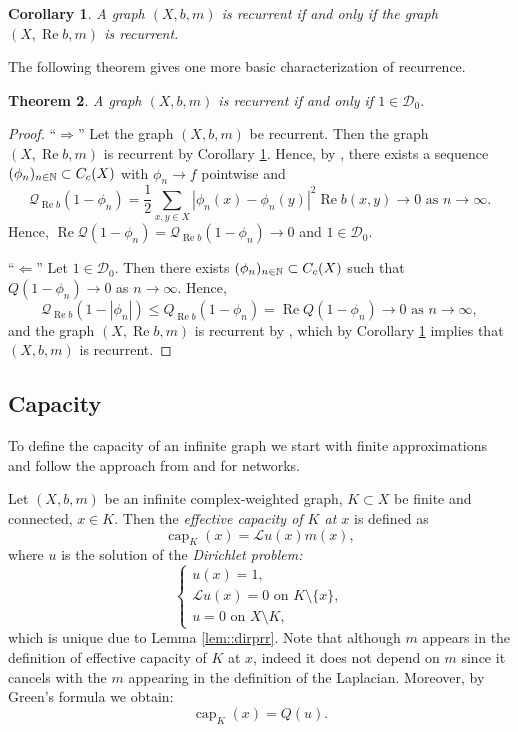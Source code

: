 \documentclass[a4paper,11pt]{amsart}
\newtheorem{theorem}{Theorem}[section]
\newtheorem{corollary}[theorem]{Corollary}
\theoremstyle{definition}
\renewcommand{\Re}{\operatorname{Re}}%
\newcommand{\cp}{\operatorname{cap}}
\renewcommand{\L}{\mathcal{L}}
\newcommand{\D}{\mathcal{D}}
\newcommand{\Q}{\mathcal{Q}}
\begin{document}
\begin{corollary}\label{cor::Rebrec}
A graph $(X,b,m)$ is recurrent if and only if the graph $(X,\Re b,m)$ is recurrent.
\end{corollary}

The following theorem gives one more basic characterization of recurrence.
\begin{theorem}\label{thm::1inD0}
A graph $(X,b,m)$ is recurrent if and only if $1\in \D_0.$
\end{theorem}

\begin{proof}
``$\Rightarrow$'' Let the graph $(X,b,m)$ be recurrent. Then the graph $(X,\Re b,m)$ is recurrent by Corollary \ref{cor::Rebrec}. Hence, by \cite[Theorem 6.1(i)]{KellerLenzWojcBook}, there exists a sequence $(\phi_n)_{n\in\Bbb N}\subset C_c(X)$ with $\phi_n\to f$ pointwise and 
$$
\Q_{\Re b}(1-\phi_n)=\dfrac12\sum_{x,y\in X}|\phi_n(x)-\phi_n(y)|^2\Re b(x,y)\to 0\mbox{ as }n\to \infty.
$$ 
Hence, $\Re \Q(1-\phi_n)=\Q_{\Re b}(1-\phi_n)\to 0$ and $1\in \D_0$.


``$\Leftarrow$''
Let $1\in \D_0$. Then there exists $(\phi_n)_{n\in\Bbb N}\subset C_c(X)$ such that $Q(1-\phi_n)\to 0$ as $n\to \infty$. Hence, 
$$
\Q_{\Re b}(1-|\phi_n|)\le Q_{\Re b}(1-\phi_n)=\Re Q(1-\phi_n)\to 0\mbox{ as }n\to \infty,
$$ 
and the graph $(X,\Re b,m)$ is recurrent by \cite[Theorem 6.1(i)]{KellerLenzWojcBook}, which by Corollary \ref{cor::Rebrec} implies that $(X,b,m)$ is recurrent.
\end{proof}


\subsection{Capacity}

To define the capacity of an infinite graph we start with finite approximations  and follow the approach from \cite{Grimmett} and \cite{Muranova3} for networks. 

Let $(X,b,m)$ be an infinite complex-weighted graph, $K\subset  X$ be finite and connected, $ x\in K $. Then the {\em effective capacity of $K$ at $x$} is defined as
$$
\cp_{K}(x)=\L u(x)m(x),
$$
where $u$ is the solution of the {\em Dirichlet problem:}
$$
\begin{cases}
 u(x)=1,\\
\L u(x)=0\mbox{ on  }K\setminus\{x\},\\
u= 0 \mbox{ on  }X\setminus K,
\end{cases}
$$
which is unique due to Lemma \ref{lem::dirprr}.
Note that although $ m $ appears in the definition of effective capacity of $K$ at $x$,  indeed it does not depend on $m$ since it cancels with the $ m $ appearing in the definition of the Laplacian. Moreover, by Green's formula we obtain:
$$
\cp_{K}(x)=Q(u).
$$
\end{document}
